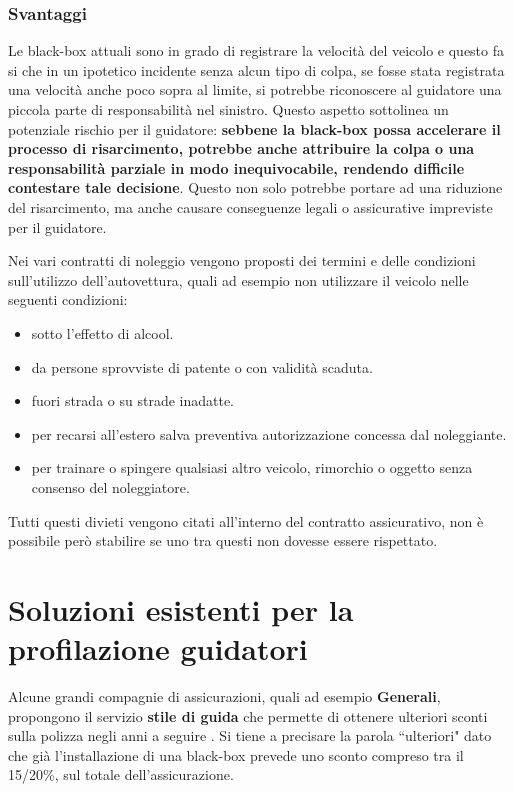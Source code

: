 \documentclass[12pt, a4paper, italian]{report}
\numberwithin{figure}{chapter}
\numberwithin{table}{chapter}
\begin{document}
\subsubsection{Svantaggi}
Le black-box attuali sono in grado di registrare la velocità del veicolo e questo fa si che in un ipotetico incidente senza alcun tipo di colpa, se fosse stata registrata una velocità anche poco sopra al limite, si potrebbe riconoscere al guidatore una piccola parte di responsabilità nel sinistro. Questo aspetto sottolinea un potenziale rischio per il guidatore: \textbf{sebbene la black-box possa accelerare il processo di risarcimento, potrebbe anche attribuire la colpa o una responsabilità parziale in modo inequivocabile, rendendo difficile contestare tale decisione}. Questo non solo potrebbe portare ad una riduzione del risarcimento, ma anche causare conseguenze legali o assicurative impreviste per il guidatore.

\vspace{1cm}

Nei vari contratti di noleggio \cite{hertz_pdf} vengono proposti dei termini e delle condizioni sull'utilizzo dell'autovettura, quali ad esempio non utilizzare il veicolo nelle seguenti condizioni: 
\begin{itemize}
    \item  sotto l'effetto di alcool.
    \item da persone sprovviste di patente o con validità scaduta.
    \item fuori strada o su strade inadatte.
    \item per recarsi all'estero salva preventiva autorizzazione concessa dal noleggiante.
    \item per trainare o spingere qualsiasi altro veicolo, rimorchio o oggetto senza consenso del noleggiatore.
\end{itemize}
Tutti questi divieti vengono citati all'interno del contratto assicurativo, non è possibile però stabilire se uno tra questi non dovesse essere rispettato.

\section{Soluzioni esistenti per la profilazione guidatori}
Alcune grandi compagnie di assicurazioni, quali ad esempio \textbf{Generali}, propongono il servizio \textbf{stile di guida} che permette di ottenere ulteriori sconti sulla polizza negli anni a seguire \cite{Generali}. Si tiene a precisare la parola ``ulteriori" dato che già l'installazione di una black-box prevede uno sconto compreso tra il 15/20\%, sul totale dell'assicurazione.%
\end{document}
